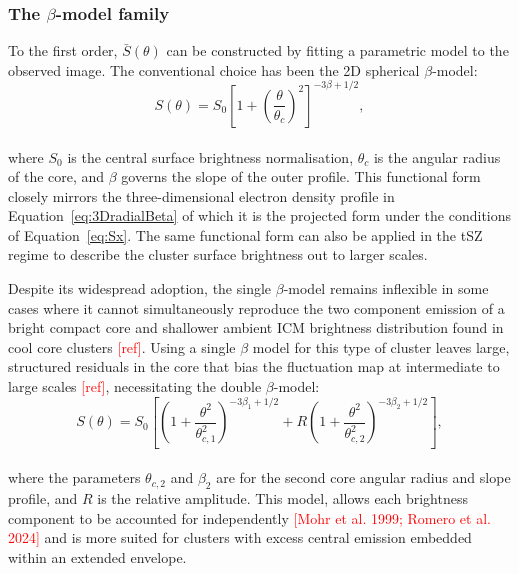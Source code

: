 \subsubsection*{The $\beta$-model family}

To the first order, $\bar{S}(\theta)$ can be constructed by fitting a parametric model to the observed image. The conventional choice has been the 2D spherical $\beta$-model: %
%
\begin{equation}
	S(\theta) = S_0 
	\left[ 1 + \left(\frac{\theta}{\theta_c}\right)^2 \right]^{-3\beta + 1/2},
	\label{eq:betamodel}
\end{equation}
\\
where $S_0$ is the central surface brightness normalisation, $\theta_c$ is the angular radius of the core, and $\beta$ governs the slope of the outer profile. This functional form closely mirrors the three-dimensional electron density profile in Equation~\ref{eq:3DradialBeta} of which it is the projected form under the conditions of Equation~\ref{eq:Sx}. The same functional form can also be applied in the tSZ regime to describe the cluster surface brightness out to larger scales. %
\par\vspace{\baselineskip}\noindent
Despite its widespread adoption, the single $\beta$-model remains inflexible in some cases where it cannot simultaneously reproduce the two component emission of a bright compact core and shallower ambient ICM brightness distribution found in cool core clusters \textcolor{red}{[ref]}. Using a single $\beta$ model for this type of cluster leaves large, structured residuals in the core that bias the fluctuation map at intermediate to large scales \textcolor{red}{[ref]}, necessitating the double $\beta$-model:
%
\begin{equation}
	S(\theta) = S_0 \left[ 
	\left(1 + \frac{\theta^2}{\theta_{c,1}^2}\right)^{-3\beta_{1} + 1/2} + 
	R\left(1 + \frac{\theta^2}{\theta_{c,2}^2}\right)^{-3\beta_{2} + 1/2}
	\right],
	\label{eq:doubleBeta}
\end{equation}
\\
where the parameters $\theta_{c,2}$ and $\beta_{2}$ are for the second core angular radius and slope profile, and $R$ is the relative amplitude. This model, allows each brightness component to be accounted for independently \textcolor{red}{[Mohr et al. 1999; Romero et al. 2024]} and is more suited for clusters with excess central emission embedded within an extended envelope.
